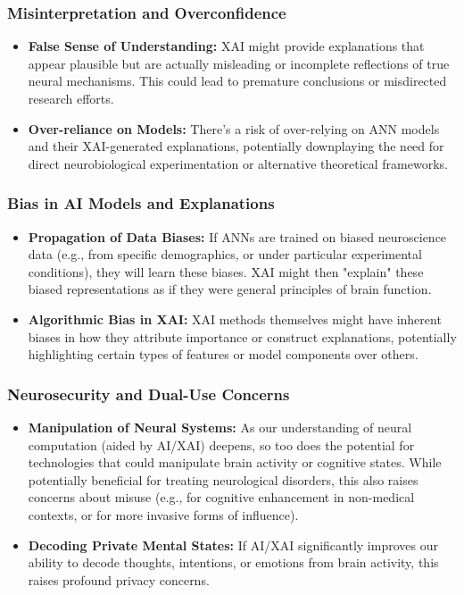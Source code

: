 \documentclass[11pt,a4paper]{article}
\begin{document}
\subsubsection{Misinterpretation and Overconfidence}
\begin{itemize}
    \item \textbf{False Sense of Understanding:} XAI might provide explanations that appear plausible but are actually misleading or incomplete reflections of true neural mechanisms. This could lead to premature conclusions or misdirected research efforts.
    \item \textbf{Over-reliance on Models:} There's a risk of over-relying on ANN models and their XAI-generated explanations, potentially downplaying the need for direct neurobiological experimentation or alternative theoretical frameworks.
\end{itemize}

\subsubsection{Bias in AI Models and Explanations}
\begin{itemize}
    \item \textbf{Propagation of Data Biases:} If ANNs are trained on biased neuroscience data (e.g., from specific demographics, or under particular experimental conditions), they will learn these biases. XAI might then "explain" these biased representations as if they were general principles of brain function.
    \item \textbf{Algorithmic Bias in XAI:} XAI methods themselves might have inherent biases in how they attribute importance or construct explanations, potentially highlighting certain types of features or model components over others.
\end{itemize}

\subsubsection{Neurosecurity and Dual-Use Concerns}
\begin{itemize}
    \item \textbf{Manipulation of Neural Systems:} As our understanding of neural computation (aided by AI/XAI) deepens, so too does the potential for technologies that could manipulate brain activity or cognitive states. While potentially beneficial for treating neurological disorders, this also raises concerns about misuse (e.g., for cognitive enhancement in non-medical contexts, or for more invasive forms of influence).
    \item \textbf{Decoding Private Mental States:} If AI/XAI significantly improves our ability to decode thoughts, intentions, or emotions from brain activity, this raises profound privacy concerns.
\end{itemize}
\end{document}
